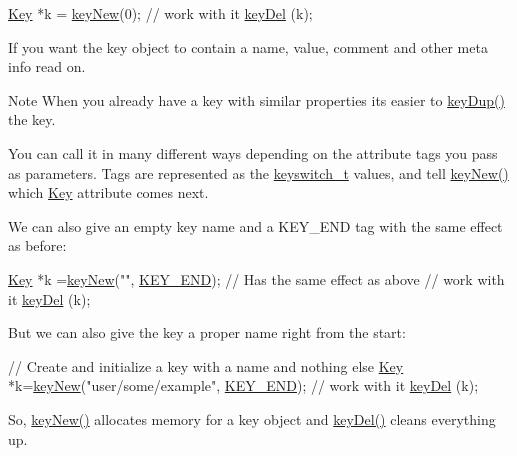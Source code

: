 \begin{DoxyCodeInclude}
\hyperlink{classkdb_1_1Key_a5679f5cae63caddd64a60388b9cc77fa}{Key} *k = \hyperlink{group__key_gad23c65b44bf48d773759e1f9a4d43b89}{keyNew}(0);
\textcolor{comment}{// work with it}
\hyperlink{group__key_ga3df95bbc2494e3e6703ece5639be5bb1}{keyDel} (k);
\end{DoxyCodeInclude}
 If you want the key object to contain a name, value, comment and other meta info read on.

\begin{DoxyNote}{Note}
When you already have a key with similar properties its easier to \hyperlink{group__key_gae6ec6a60cc4b8c1463fa08623d056ce3}{key\-Dup()} the key.
\end{DoxyNote}
You can call it in many different ways depending on the attribute tags you pass as parameters. Tags are represented as the \hyperlink{group__key_ga91fb3178848bd682000958089abbaf40}{keyswitch\-\_\-t} values, and tell \hyperlink{group__key_gad23c65b44bf48d773759e1f9a4d43b89}{key\-New()} which \hyperlink{classkdb_1_1Key}{Key} attribute comes next.

We can also give an empty key name and a K\-E\-Y\-\_\-\-E\-N\-D tag with the same effect as before\-:


\begin{DoxyCodeInclude}
\hyperlink{classkdb_1_1Key_a5679f5cae63caddd64a60388b9cc77fa}{Key} *k =\hyperlink{group__key_gad23c65b44bf48d773759e1f9a4d43b89}{keyNew}(\textcolor{stringliteral}{""}, \hyperlink{group__key_gga91fb3178848bd682000958089abbaf40aa8adb6fcb92dec58fb19410eacfdd403}{KEY\_END}); \textcolor{comment}{// Has the same effect as above}
\textcolor{comment}{// work with it}
\hyperlink{group__key_ga3df95bbc2494e3e6703ece5639be5bb1}{keyDel} (k);
\end{DoxyCodeInclude}
 But we can also give the key a proper name right from the start\-:


\begin{DoxyCodeInclude}
\textcolor{comment}{// Create and initialize a key with a name and nothing else}
\hyperlink{classkdb_1_1Key_a5679f5cae63caddd64a60388b9cc77fa}{Key} *k=\hyperlink{group__key_gad23c65b44bf48d773759e1f9a4d43b89}{keyNew}(\textcolor{stringliteral}{"user/some/example"}, \hyperlink{group__key_gga91fb3178848bd682000958089abbaf40aa8adb6fcb92dec58fb19410eacfdd403}{KEY\_END});
\textcolor{comment}{// work with it}
\hyperlink{group__key_ga3df95bbc2494e3e6703ece5639be5bb1}{keyDel} (k);
\end{DoxyCodeInclude}
 So, \hyperlink{group__key_gad23c65b44bf48d773759e1f9a4d43b89}{key\-New()} allocates memory for a key object and \hyperlink{group__key_ga3df95bbc2494e3e6703ece5639be5bb1}{key\-Del()} cleans everything up.


